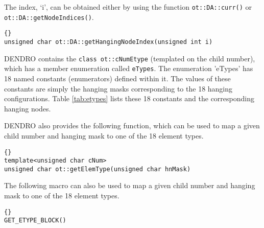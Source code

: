 \documentclass[10pt,reqno,a4paper]{report}
\numberwithin{equation}{section}
\begin{document}
The index, `i', can be obtained either by using the function \lstinline[basicstyle=\bfseries]!ot::DA::curr()! or \lstinline[basicstyle=\bfseries]!ot::DA::getNodeIndices()!.

\begin{lstlisting}[frame=trbl, fontadjust]{}
unsigned char ot::DA::getHangingNodeIndex(unsigned int i)
\end{lstlisting}

DENDRO contains the \lstinline[basicstyle=\bfseries]!class ot::cNumEtype! (templated on the child number), which has a member enumeration called \lstinline[basicstyle=\bfseries]!eTypes!. The enumeration 'eTypes' has 18 named constants (enumerators) defined within it. The values of these constants are simply the hanging masks corresponding to the 18 hanging configurations. Table \ref{tab:etypes} lists these 18 constants and the corresponding hanging nodes. 

DENDRO also provides the following function, which can be used to map a given child number and hanging mask to one of the 18 element types.

\begin{lstlisting}[frame=trbl, fontadjust]{}
template<unsigned char cNum>
unsigned char ot::getElemType(unsigned char hnMask)
\end{lstlisting}

The following macro can also be used to map a given child number and hanging mask to one of the 18 element types.

\begin{lstlisting}[frame=trbl, fontadjust]{}
GET_ETYPE_BLOCK()
\end{lstlisting}
   
\end{document}
